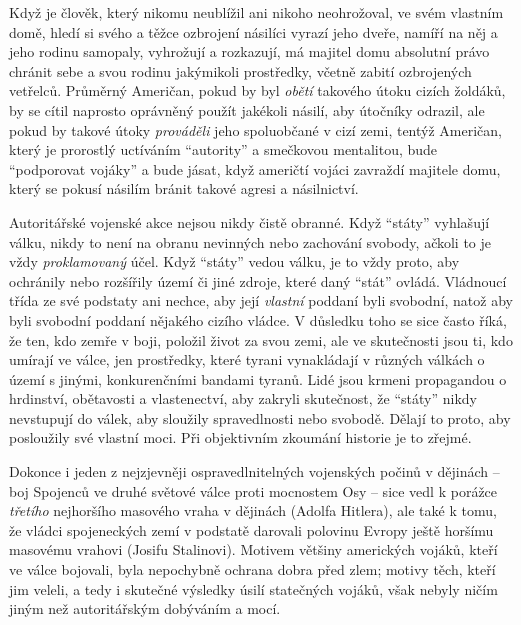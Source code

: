\documentclass{book}
\begin{document}
Když je člověk, který nikomu neublížil ani nikoho neohrožoval, ve svém vlastním domě, hledí si svého a těžce ozbrojení násilíci vyrazí jeho dveře, namíří na něj a jeho rodinu samopaly, vyhrožují a rozkazují, má majitel domu absolutní právo chránit sebe a svou rodinu jakýmikoli prostředky, včetně zabití ozbrojených vetřelců. Průměrný Američan, pokud by byl \emph{obětí} takového útoku cizích žoldáků, by se cítil naprosto oprávněný použít jakékoli násilí, aby útočníky odrazil, ale pokud by takové útoky \emph{prováděli} jeho spoluobčané v cizí zemi, tentýž Američan, který je prorostlý uctíváním \enquote{autority} a smečkovou mentalitou, bude \enquote{podporovat vojáky} a bude jásat, když američtí vojáci zavraždí majitele domu, který se pokusí násilím bránit takové agresi a násilnictví.

Autoritářské vojenské akce nejsou nikdy čistě obranné. Když \enquote{státy} vyhlašují válku, nikdy to není na obranu nevinných nebo zachování svobody, ačkoli to je vždy \emph{proklamovaný} účel. Když \enquote{státy} vedou válku, je to vždy proto, aby ochránily nebo rozšířily území či jiné zdroje, které daný \enquote{stát} ovládá. Vládnoucí třída ze své podstaty ani nechce, aby její \emph{vlastní} poddaní byli svobodní, natož aby byli svobodní poddaní nějakého cizího vládce. V důsledku toho se sice často říká, že ten, kdo zemře v boji, položil život za svou zemi, ale ve skutečnosti jsou ti, kdo umírají ve válce, jen prostředky, které tyrani vynakládají v různých válkách o území s jinými, konkurenčními bandami tyranů. Lidé jsou krmeni propagandou o hrdinství, obětavosti a vlastenectví, aby zakryli skutečnost, že \enquote{státy} nikdy nevstupují do válek, aby sloužily spravedlnosti nebo svobodě. Dělají to proto, aby posloužily své vlastní moci. Při objektivním zkoumání historie je to zřejmé.

Dokonce i jeden z nejzjevněji ospravedlnitelných vojenských počinů v dějinách -- boj Spojenců ve druhé světové válce proti mocnostem Osy -- sice vedl k porážce \emph{třetího} nejhoršího masového vraha v dějinách (Adolfa Hitlera), ale také k tomu, že vládci spojeneckých zemí v podstatě darovali polovinu Evropy ještě horšímu masovému vrahovi (Josifu Stalinovi). Motivem většiny amerických vojáků, kteří ve válce bojovali, byla nepochybně ochrana dobra před zlem; motivy těch, kteří jim veleli, a tedy i skutečné výsledky úsilí statečných vojáků, však nebyly ničím jiným než autoritářským dobýváním a mocí.
\end{document}
